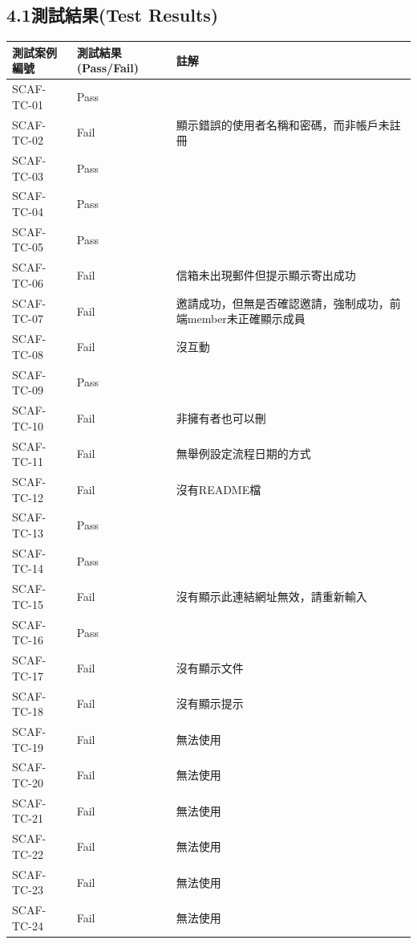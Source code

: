 \documentclass{report}
\begin{document}
\subsection*{4.1測試結果(Test Results)}
\begin{tabularx}{\textwidth}{
  |p{}%
  |p{}%
  |p{}|%
}
  \hline
  測試案例編號 & 測試結果(Pass/Fail) & 註解 \\ \hline
  SCAF-TC-01 & Pass &  \\ \hline
  SCAF-TC-02 & Fail & 顯示錯誤的使用者名稱和密碼，而非帳戶未註冊 \\ \hline
  SCAF-TC-03 & Pass &  \\ \hline
  SCAF-TC-04 & Pass &  \\ \hline
  SCAF-TC-05 & Pass &  \\ \hline
  SCAF-TC-06 & Fail & 信箱未出現郵件但提示顯示寄出成功 \\ \hline
  SCAF-TC-07 & Fail & 邀請成功，但無是否確認邀請，強制成功，前端member未正確顯示成員 \\ \hline
  SCAF-TC-08 & Fail & 沒互動 \\ \hline
  SCAF-TC-09 & Pass &  \\ \hline
  SCAF-TC-10 & Fail & 非擁有者也可以刪 \\ \hline
  SCAF-TC-11 & Fail & 無舉例設定流程日期的方式 \\ \hline
  SCAF-TC-12 & Fail & 沒有README檔 \\ \hline
  SCAF-TC-13 & Pass &  \\ \hline
  SCAF-TC-14 & Pass &  \\ \hline
  SCAF-TC-15 & Fail & 沒有顯示此連結網址無效，請重新輸入 \\ \hline
  SCAF-TC-16 & Pass &  \\ \hline
  SCAF-TC-17 & Fail & 沒有顯示文件 \\ \hline
  SCAF-TC-18 & Fail & 沒有顯示提示 \\ \hline
  SCAF-TC-19 & Fail & 無法使用 \\ \hline
  SCAF-TC-20 & Fail & 無法使用 \\ \hline
  SCAF-TC-21 & Fail & 無法使用 \\ \hline
  SCAF-TC-22 & Fail & 無法使用 \\ \hline
  SCAF-TC-23 & Fail & 無法使用 \\ \hline
  SCAF-TC-24 & Fail & 無法使用 \\ \hline

\end{tabularx}
\end{document}
